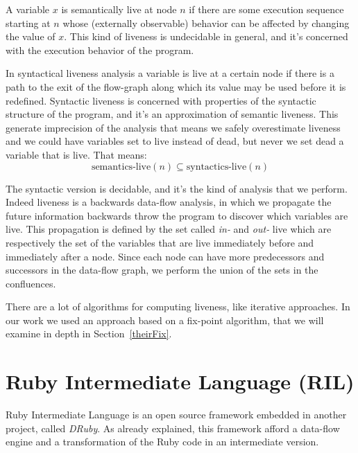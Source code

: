 \documentclass[a4paper]{article}   %
\begin{document}
A variable $x$ is semantically live at node $n$ if there are some execution sequence starting at $n$ whose (externally observable) behavior can be affected by changing the value of $x$. This kind of liveness is undecidable in general, and it's concerned with the execution behavior of the program.

In syntactical liveness analysis a variable is live at a certain node if there is a path to the exit of the flow-graph along which its value may be used before it is redefined. 
Syntactic liveness is concerned with properties of the syntactic structure of the program, and it's an approximation of semantic liveness. 
This generate imprecision of the analysis that means we safely overestimate liveness and we could have variables set to live instead of dead, but never we set dead a variable that is live. 
That means:
\begin{equation*}
\text{semantics-live}(n) \subseteq \text{syntactics-live}(n)
\end{equation*}

The syntactic version is decidable, and it's the kind of analysis that we perform.
Indeed liveness is a backwards data-flow analysis, in which we propagate the future information backwards throw the program to discover which variables are live.
This propagation is defined by the set called \emph{in-} and \emph{out-} live which are respectively the set of the variables that are live immediately before and immediately after a node.
Since each node can have more predecessors and successors in the data-flow graph, we perform the union of the sets in the confluences.

There are a lot of algorithms for computing liveness, like iterative approaches. In our work we used an approach based on a fix-point algorithm, that we will examine in depth in Section~\ref{theirFix}.

\section{Ruby Intermediate Language (RIL)}
Ruby Intermediate Language is an open source framework \cite{ril} embedded in another project, called \emph{DRuby}\cite{druby}. As already explained, this framework afford a data-flow engine and a transformation of the Ruby code in an intermediate version. 

\end{document}
